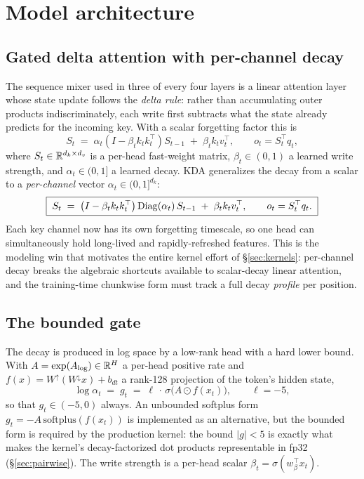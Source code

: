\section{Model architecture}
\label{sec:architecture}

\subsection{Gated delta attention with per-channel decay}

The sequence mixer used in three of every four layers is a linear
attention layer whose state update follows the \emph{delta rule}: rather
than accumulating outer products indiscriminately, each write first
subtracts what the state already predicts for the incoming key. With a
scalar forgetting factor this is
\begin{equation}
S_t \;=\; \alpha_t \left(I - \beta_t k_t k_t^{\top}\right) S_{t-1}
\;+\; \beta_t k_t v_t^{\top},
\qquad o_t = S_t^{\top} q_t ,
\label{eq:scalar-delta}
\end{equation}
where $S_t \in \mathbb{R}^{d_k \times d_v}$ is a per-head fast-weight matrix,
$\beta_t \in (0,1)$ a learned write strength, and $\alpha_t \in (0,1]$ a
learned decay. KDA generalizes the decay from a scalar to a
\emph{per-channel} vector $\alpha_t \in (0,1]^{d_k}$:
\begin{equation}
\boxed{\;
S_t \;=\; \left(I - \beta_t k_t k_t^{\top}\right) \operatorname{Diag}(\alpha_t)\,
S_{t-1} \;+\; \beta_t k_t v_t^{\top},
\qquad o_t = S_t^{\top} q_t .
\;}
\label{eq:kda}
\end{equation}
Each key channel now has its own forgetting timescale, so one head can
simultaneously hold long-lived and rapidly-refreshed features. This is
the modeling win that motivates the entire kernel effort of
\S\ref{sec:kernels}: per-channel decay breaks the algebraic shortcuts
available to scalar-decay linear attention, and the training-time
chunkwise form must track a full decay \emph{profile} per position.

\subsection{The bounded gate}

The decay is produced in log space by a low-rank head with a hard lower
bound. With $A = \exp(A_{\log}) \in \mathbb{R}^{H}$ a per-head positive rate and
$f(x) = W^{\uparrow}(W^{\downarrow} x) + b_{dt}$ a rank-128 projection of
the token's hidden state,
\begin{equation}
\log \alpha_t \;=\; g_t \;=\; \ell \,\cdot\, \sigma\!\big(A \odot f(x_t)\big),
\qquad \ell = -5,
\label{eq:safe-gate}
\end{equation}
so that $g_t \in (-5, 0)$ always. An unbounded softplus form
$g_t = -A\,\mathrm{softplus}(f(x_t))$ is implemented as an alternative,
but the bounded form is required by the production kernel: the bound
$|g| < 5$ is exactly what makes the kernel's decay-factorized dot
products representable in fp32 (\S\ref{sec:pairwise}). The write
strength is a per-head scalar $\beta_t = \sigma(w_\beta^{\top} x_t)$.

